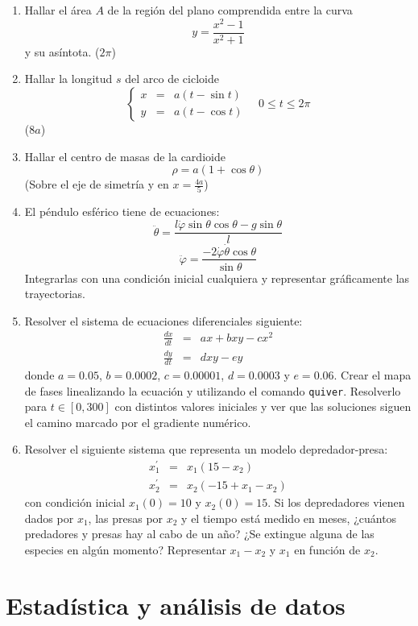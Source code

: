 \begin{enumerate}
\item Hallar el área $A$ de la región del plano comprendida entre la
  curva
$$ y=\frac{x^{2}-1}{x^{2}+1}$$
 y su asíntota. ($2\pi$)
\item Hallar la longitud $s$ del arco de cicloide
$$ \left\{
    \begin{array}{ccc}
      x & = & a(t-\sin t)\\
      y & = & a(t-\cos t)\end{array}\right.\quad0\leq t\leq2\pi$$
  ($8a$)
\item Hallar el centro de masas de la cardioide
$$
  \rho=a(1+\cos\theta)$$ (Sobre el eje de simetría y en
  $x=\frac{4a}{5}$)
\item El péndulo esférico tiene de ecuaciones:$$
  \ddot{\theta}=\frac{l\dot{\varphi}\sin\theta\cos\theta-g\sin\theta}{l}$$
  $$
  \ddot{\varphi}=\frac{-2\dot{\varphi}\dot{\theta}\cos\theta}{\sin\theta}$$
  Integrarlas con una condición inicial cualquiera y representar
  gráficamente las trayectorias.
\item Resolver el sistema de ecuaciones diferenciales siguiente:$$
  \begin{array}{ccc}
    \frac{dx}{dt} & = & ax+bxy-cx^{2}\\
    \frac{dy}{dt} & = & dxy-ey\end{array}$$
  donde $a=0.05$, $b=0.0002$, $c=0.00001$, $d=0.0003$ y $e=0.06$.
  Crear el mapa de fases linealizando la ecuación y utilizando el comando
  \texttt{quiver}. Resolverlo para $t\in[0,300]$ con distintos valores
  iniciales y ver que las soluciones siguen el camino marcado por el
  gradiente numérico.
\item Resolver el siguiente sistema que representa un modelo
  depredador-presa:$$
  \begin{array}{ccc}
    x_{1}^{\prime} & = & x_{1}(15-x_{2})\\
    x_{2}^{\prime} & = & x_{2}(-15+x_{1}-x_{2})\end{array}$$
  con condición inicial $x_{1}(0)=10$ y $x_{2}(0)=15$. Si los depredadores
  vienen dados por $x_{1}$, las presas por $x_{2}$ y el tiempo está
  medido en meses, ¿cuántos predadores y presas hay al cabo de un año?
  ¿Se extingue alguna de las especies en algún momento? Representar
  $x_{1}-x_{2}$ y $x_{1}$ en función de $x_{2}$.
\end{enumerate}

\section{Estadística y análisis de datos}

